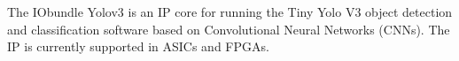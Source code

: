 The IObundle Yolov3 is an IP core for running the Tiny Yolo V3 object detection and
classification software based on Convolutional Neural Networks (CNNs). The IP is
currently supported in ASICs and FPGAs.
